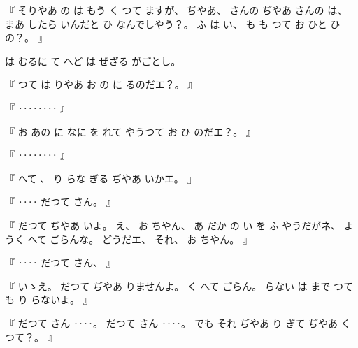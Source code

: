 %
『
そりやあ
の
は
もう
く
つて
ますが、
%
ぢやあ、
%
さんの
%
ぢやあ
さんの
は、
%
まあ
したら
いんだと
ひ
なんでしやう？。
%
ふ
は
い、
%
も
も
つて
お
ひと
ひの？。
』

%
は
むるに
て
へど
は
ぜざる
がごとし。

%
『
つて
は
りやあ
お
の
に
るのだエ？。
』

%
『
‥‥‥‥
』

%
『
お
あの
に
なに
を
れて
やうつて
お
ひ
のだエ？。
』

%
『
‥‥‥‥
』

%
『
へて
、
%
り
らな
ぎる
ぢやあ
いかエ。
』

%
『
‥‥
だつて
さん。
』

%
『
だつて
ぢやあ
いよ。
%
え、
%
お
ちやん、
%
あ
だか
の
い
を
ふ
やうだがネ、
%
ようく
へて
ごらんな。
%
どうだエ、
それ、
%
お
ちやん。
』

%
『
‥‥
だつて
さん、
』

%
『
いゝえ。
%
だつて
ぢやあ
りませんよ。
%
く
へて
ごらん。
%
らない
は
まで
つても
り%
らないよ。
』

%
『
だつて
さん
‥‥。
%
だつて
さん
‥‥。
%
でも
それ
ぢやあ
り
ぎて
ぢやあ
くつて？。
』
